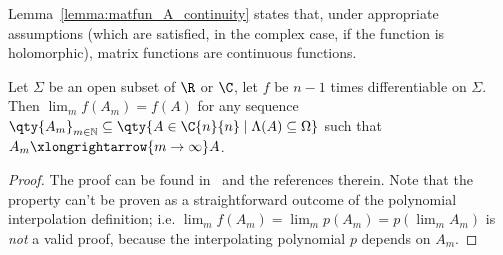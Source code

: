 \noindent Lemma~\ref{lemma:matfun_A_continuity} states that, under appropriate assumptions (which are satisfied, in the complex case, if the function is holomorphic), matrix functions are continuous functions.
\begin{lemma}\label{lemma:matfun_A_continuity}
	Let $\Sigma$ be an open subset of $\R$ or $\C$, let $f$ be $n-1$ times differentiable on $\Sigma$. Then $\lim_{m}f(A_m)=f(A)$ for any sequence $\qty{A_m}_{m\in\mathbb{N}}\subseteq\qty{A\in\C{n}{n}\mid\Lambda(A)\subseteq\Omega}$ such that $A_m\xlongrightarrow{m\to\infty}A$.
\end{lemma}
\begin{proof}
	The proof can be found in~\cite[Thm.~1.19]{higham:matfun_book} and the references therein. Note that the property can't be proven as a straightforward outcome of the polynomial interpolation definition; i.e. $\lim_{m}f(A_m)=\lim_{m}p(A_m)=p(\lim_{m}A_m)$ is \emph{not} a valid proof, because the interpolating polynomial $p$ depends on $A_m$.
\end{proof}
\smallskip 

